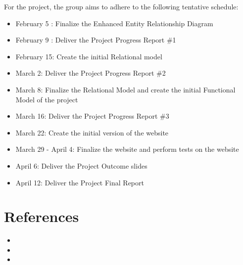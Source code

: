 \documentclass[letterpaper,12pt]{article}
\begin{document}
For the project, the group aims to adhere to the following tentative schedule:
\begin{itemize}
	\item February 5 : Finalize the Enhanced Entity Relationship Diagram
	\item February 9 : Deliver the Project Progress Report \#1
	\item February 15: Create the initial Relational model
	\item March 2: Deliver the Project Progress Report \#2
	\item March 8: Finalize the Relational Model and create the initial Functional Model of the project 
	\item March 16: Deliver the Project Progress Report \#3
	\item March 22: Create the initial version of the website
	\item March 29 - April 4: Finalize the website and perform tests on the website
	\item April 6: Deliver the Project Outcome slides
	\item April 12: Deliver the Project Final Report
\end{itemize}


\section{References}
\begin{itemize}
	\item
	\item 
	\item 
\end{itemize}
\end{document}
